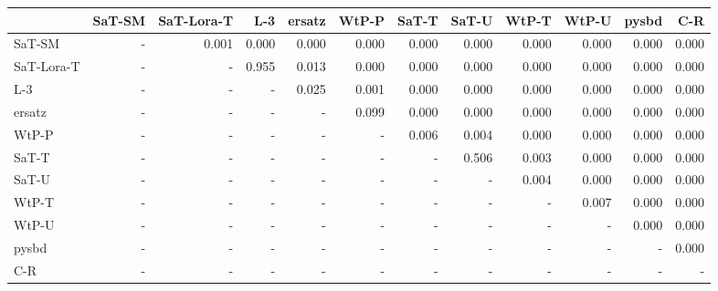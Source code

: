 \begin{tabular}{lrrrrrrrrrrr}
\toprule
 & SaT-SM & SaT-Lora-T & L-3 & ersatz & WtP-P & SaT-T & SaT-U & WtP-T & WtP-U & pysbd & C-R \\
\midrule
SaT-SM & - & 0.001 & 0.000 & 0.000 & 0.000 & 0.000 & 0.000 & 0.000 & 0.000 & 0.000 & 0.000 \\
SaT-Lora-T & - & - & 0.955 & 0.013 & 0.000 & 0.000 & 0.000 & 0.000 & 0.000 & 0.000 & 0.000 \\
L-3 & - & - & - & 0.025 & 0.001 & 0.000 & 0.000 & 0.000 & 0.000 & 0.000 & 0.000 \\
ersatz & - & - & - & - & 0.099 & 0.000 & 0.000 & 0.000 & 0.000 & 0.000 & 0.000 \\
WtP-P & - & - & - & - & - & 0.006 & 0.004 & 0.000 & 0.000 & 0.000 & 0.000 \\
SaT-T & - & - & - & - & - & - & 0.506 & 0.003 & 0.000 & 0.000 & 0.000 \\
SaT-U & - & - & - & - & - & - & - & 0.004 & 0.000 & 0.000 & 0.000 \\
WtP-T & - & - & - & - & - & - & - & - & 0.007 & 0.000 & 0.000 \\
WtP-U & - & - & - & - & - & - & - & - & - & 0.000 & 0.000 \\
pysbd & - & - & - & - & - & - & - & - & - & - & 0.000 \\
C-R & - & - & - & - & - & - & - & - & - & - & - \\
\bottomrule
\end{tabular}


